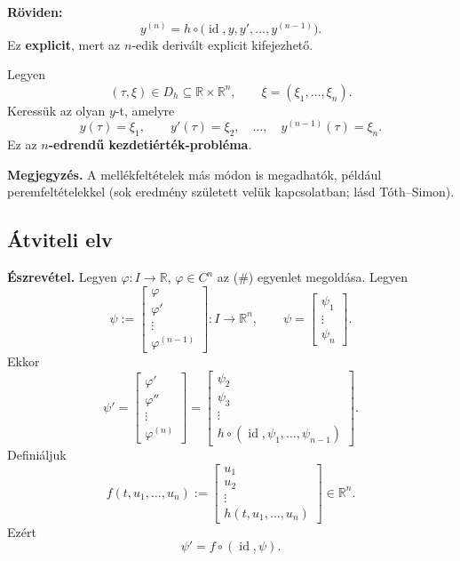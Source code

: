 \textbf{Röviden:}
\[
 y^{(n)}=h\circ\bigl(\operatorname{id},y,y',\ldots,
             y^{(n-1)}\bigr).\tag{\#}
\]
Ez \textbf{explicit}, mert az $n$-edik derivált explicit kifejezhető.

Legyen
\[
 (\tau,\xi)\in D_h\subseteq\mathbb R\times\mathbb R^n,
 \qquad\xi=(\xi_1,\ldots,\xi_n).
\]
Keressük az olyan $y$-t, amelyre
\[
 y(\tau)=\xi_1,\qquad y'(\tau)=\xi_2,
 \quad\ldots,\quad y^{(n-1)}(\tau)=\xi_n.
\]
Ez az \textbf{$n$-edrendű kezdetiérték-probléma}.

\textbf{Megjegyzés.} A mellékfeltételek más módon is megadhatók,
például peremfeltételekkel (sok eredmény született velük
kapcsolatban; lásd Tóth--Simon).

\subsection{Átviteli elv}
\textbf{Észrevétel.} Legyen $\varphi:I\to\mathbb R$,
$\varphi\in C^n$ az (\#) egyenlet megoldása. Legyen
\[
 \psi:=\begin{bmatrix}
     \varphi\\\varphi'\\\vdots\\\varphi^{(n-1)}
 \end{bmatrix}:I\to\mathbb R^n,
 \qquad
 \psi=\begin{bmatrix}\psi_1\\\vdots\\\psi_n\end{bmatrix}.
\]
Ekkor
\[
 \psi'=\begin{bmatrix}
 \varphi'\\\varphi''\\\vdots\\\varphi^{(n)}
 \end{bmatrix}
 =\begin{bmatrix}
 \psi_2\\\psi_3\\\vdots\\
 h\circ(\operatorname{id},\psi_1,\ldots,\psi_{n-1})
 \end{bmatrix}.
\]
Definiáljuk
\[
 f(t,u_1,\ldots,u_n):=
 \begin{bmatrix}
 u_1\\u_2\\\vdots\\h(t,u_1,\ldots,u_n)
 \end{bmatrix}\in\mathbb R^n.
\]
Ezért
\[
 \psi'=f\circ(\operatorname{id},\psi).
\]

